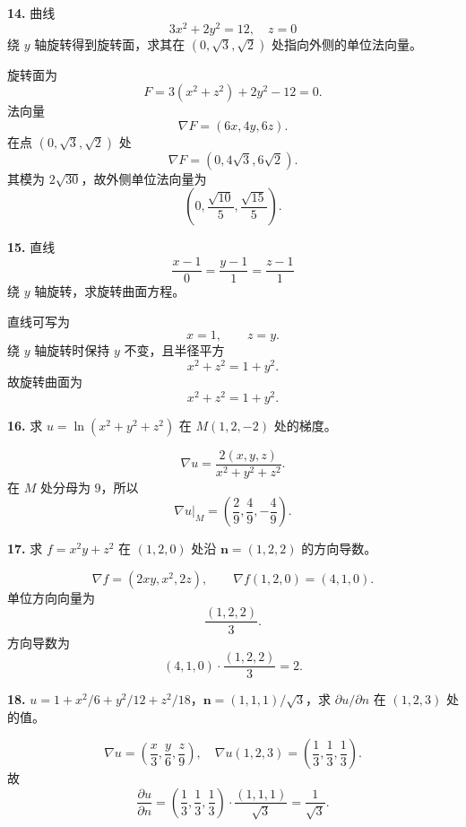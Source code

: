 \begin{problemblock}
\textbf{14.} 曲线
\[
3x^2+2y^2=12,\quad z=0
\]
绕 \(y\) 轴旋转得到旋转面，求其在 \((0,\sqrt3,\sqrt2)\) 处指向外侧的单位法向量。
\end{problemblock}
\begin{solutionblock}
旋转面为
\[
F=3(x^2+z^2)+2y^2-12=0.
\]
法向量
\[
\nabla F=(6x,4y,6z).
\]
在点 \((0,\sqrt3,\sqrt2)\) 处
\[
\nabla F=(0,4\sqrt3,6\sqrt2).
\]
其模为 \(2\sqrt{30}\)，故外侧单位法向量为
\[
\boxed{\left(0,\frac{\sqrt{10}}5,\frac{\sqrt{15}}5\right)}.
\]
\end{solutionblock}

\begin{problemblock}
\textbf{15.} 直线
\[
\frac{x-1}{0}=\frac{y-1}{1}=\frac{z-1}{1}
\]
绕 \(y\) 轴旋转，求旋转曲面方程。
\end{problemblock}
\begin{solutionblock}
直线可写为
\[
x=1,\qquad z=y.
\]
绕 \(y\) 轴旋转时保持 \(y\) 不变，且半径平方
\[
x^2+z^2=1+y^2.
\]
故旋转曲面为
\[
\boxed{x^2+z^2=1+y^2}.
\]
\end{solutionblock}

\begin{problemblock}
\textbf{16.} 求 \(u=\ln(x^2+y^2+z^2)\) 在 \(M(1,2,-2)\) 处的梯度。
\end{problemblock}
\begin{solutionblock}
\[
\nabla u=\frac{2(x,y,z)}{x^2+y^2+z^2}.
\]
在 \(M\) 处分母为 \(9\)，所以
\[
\boxed{\nabla u|_M=\left(\frac29,\frac49,-\frac49\right)}.
\]
\end{solutionblock}

\begin{problemblock}
\textbf{17.} 求 \(f=x^2y+z^2\) 在 \((1,2,0)\) 处沿 \(\boldsymbol n=(1,2,2)\) 的方向导数。
\end{problemblock}
\begin{solutionblock}
\[
\nabla f=(2xy,x^2,2z),
\qquad \nabla f(1,2,0)=(4,1,0).
\]
单位方向向量为
\[
\frac{(1,2,2)}3.
\]
方向导数为
\[
(4,1,0)\cdot\frac{(1,2,2)}3=\boxed{2}.
\]
\end{solutionblock}

\begin{problemblock}
\textbf{18.} \(u=1+x^2/6+y^2/12+z^2/18\)，\(\boldsymbol n=(1,1,1)/\sqrt3\)，求 \(\partial u/\partial n\) 在 \((1,2,3)\) 处的值。
\end{problemblock}
\begin{solutionblock}
\[
\nabla u=\left(\frac x3,\frac y6,\frac z9\right),
\quad
\nabla u(1,2,3)=\left(\frac13,\frac13,\frac13\right).
\]
故
\[
\frac{\partial u}{\partial n}
=\left(\frac13,\frac13,\frac13\right)\cdot\frac{(1,1,1)}{\sqrt3}
=\boxed{\frac1{\sqrt3}}.
\]
\end{solutionblock}

